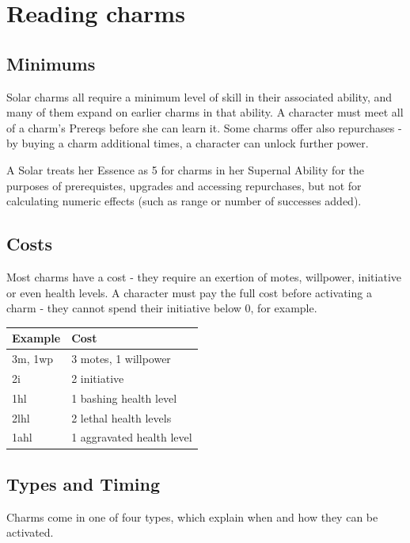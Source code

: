 \documentclass[oneside]{book}
\begin{document}
\section{Reading charms}
\begin{multicols}{2}

\subsection*{Minimums}
\par Solar charms all require a minimum level of skill in their associated ability, and many of them expand on earlier charms in that ability. A character must meet all of a charm's Prereqs before she can learn it. Some charms offer also repurchases - by buying a charm additional times, a character can unlock further power.

\par A Solar treats her Essence as 5 for charms in her Supernal Ability for the purposes of prerequistes, upgrades and accessing repurchases, but not for calculating numeric effects (such as range or number of successes added).

\subsection*{Costs}
\par Most charms have a cost - they require an exertion of motes, willpower, initiative or even health levels. A character must pay the full cost before activating a charm - they cannot spend their initiative below 0, for example.

\begin{tabular}{ll}
  Example & Cost\\
  \hline
  3m, 1wp & 3 motes, 1 willpower\\
  2i & 2 initiative\\
  1hl & 1 bashing health level\\
  2lhl & 2 lethal health levels\\
  1ahl & 1 aggravated health level\\
\end{tabular}

\subsection*{Types and Timing}
\par Charms come in one of four types, which explain when and how they can be activated.


\end{multicols}
\end{document}
